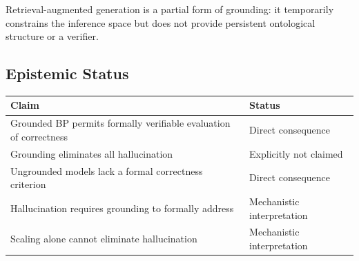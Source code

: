 Retrieval-augmented generation is a partial form of grounding: it
temporarily constrains the inference space but does not provide persistent
ontological structure or a verifier.

\subsection*{Epistemic Status}

\begin{center}
\begin{tabular}{ll}
\toprule
Claim & Status \\
\midrule
Grounded BP permits formally verifiable evaluation of correctness & Direct consequence \\
Grounding eliminates all hallucination & Explicitly not claimed \\
Ungrounded models lack a formal correctness criterion & Direct consequence \\
Hallucination requires grounding to formally address & Mechanistic interpretation \\
Scaling alone cannot eliminate hallucination & Mechanistic interpretation \\
\bottomrule
\end{tabular}
\end{center}
